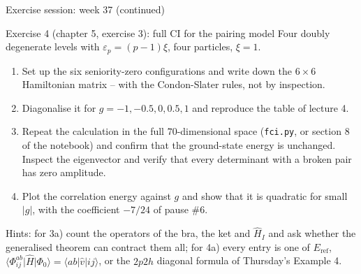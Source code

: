\documentclass[aspectratio=169,10pt]{beamer}
\newcommand{\element}[3]{\langle #1\vert #2\vert #3\rangle}
\begin{document}
\begin{frame}{Exercise session: week 37 (continued)}
  \footnotesize
  \begin{block}{Exercise 4 (chapter 5, exercise 3): full CI for the pairing model}
    Four doubly degenerate levels with $\varepsilon_p=(p-1)\xi$, four particles, $\xi=1$.
    \begin{enumerate}
      \item[a)] Set up the six seniority-zero configurations and write down the $6\times6$ Hamiltonian matrix -- with the Condon-Slater rules, not by inspection.
      \item[b)] Diagonalise it for $g=-1,-0.5,0,0.5,1$ and reproduce the table of lecture 4.
      \item[c)] Repeat the calculation in the full $70$-dimensional space (\texttt{fci.py}, or section 8 of the notebook) and confirm that the ground-state energy is unchanged. Inspect the eigenvector and verify that every determinant with a broken pair has zero amplitude.
      \item[d)] Plot the correlation energy against $g$ and show that it is quadratic for small $|g|$, with the coefficient $-7/24$ of pause \#6.
    \end{enumerate}
  \end{block}
  Hints: for 3a) count the operators of the bra, the ket and $\hat{H}_I$ and ask whether the generalised theorem can contract them all; for 4a) every entry is one of $E_{\mathrm{ref}}$, $\element{\Phi_{ij}^{ab}}{\hat{H}}{\Phi_0}=\element{ab}{\hat{v}}{ij}$, or the $2p2h$ diagonal formula of Thursday's Example 4.
\end{frame}
\end{document}
